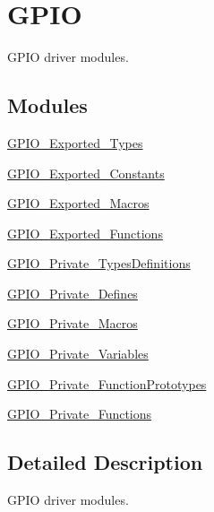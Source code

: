 \hypertarget{group___g_p_i_o}{}\section{G\+P\+IO}
\label{group___g_p_i_o}


G\+P\+IO driver modules.  


\subsection*{Modules}
\begin{DoxyCompactItemize}
\item 
\hyperlink{group___g_p_i_o___exported___types}{G\+P\+I\+O\+\_\+\+Exported\+\_\+\+Types}
\item 
\hyperlink{group___g_p_i_o___exported___constants}{G\+P\+I\+O\+\_\+\+Exported\+\_\+\+Constants}
\item 
\hyperlink{group___g_p_i_o___exported___macros}{G\+P\+I\+O\+\_\+\+Exported\+\_\+\+Macros}
\item 
\hyperlink{group___g_p_i_o___exported___functions}{G\+P\+I\+O\+\_\+\+Exported\+\_\+\+Functions}
\item 
\hyperlink{group___g_p_i_o___private___types_definitions}{G\+P\+I\+O\+\_\+\+Private\+\_\+\+Types\+Definitions}
\item 
\hyperlink{group___g_p_i_o___private___defines}{G\+P\+I\+O\+\_\+\+Private\+\_\+\+Defines}
\item 
\hyperlink{group___g_p_i_o___private___macros}{G\+P\+I\+O\+\_\+\+Private\+\_\+\+Macros}
\item 
\hyperlink{group___g_p_i_o___private___variables}{G\+P\+I\+O\+\_\+\+Private\+\_\+\+Variables}
\item 
\hyperlink{group___g_p_i_o___private___function_prototypes}{G\+P\+I\+O\+\_\+\+Private\+\_\+\+Function\+Prototypes}
\item 
\hyperlink{group___g_p_i_o___private___functions}{G\+P\+I\+O\+\_\+\+Private\+\_\+\+Functions}
\end{DoxyCompactItemize}


\subsection{Detailed Description}
G\+P\+IO driver modules. 


